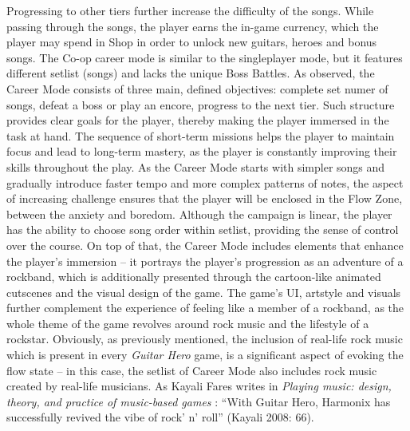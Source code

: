 Progressing to other tiers further increase the difficulty of the songs. While passing through the songs, the player earns the in-game currency, which the player may spend in Shop in order to unlock new guitars, heroes and bonus songs. The Co-op career mode is similar to the singleplayer mode, but it features different setlist (songs) and lacks the unique Boss Battles. As observed, the Career Mode consists of three main, defined objectives: complete set numer of songs, defeat a boss or play an encore, progress to the next tier. Such structure provides clear goals for the player, thereby making the player immersed in the task at hand. The sequence of short-term missions helps the player to maintain focus and lead to long-term mastery, as the player is constantly improving their skills throughout the play. As the Career Mode starts with simpler songs and gradually introduce faster tempo and more complex patterns of notes, the aspect of increasing challenge ensures that the player will be enclosed in the Flow Zone, between the anxiety and boredom. Although the campaign is linear, the player has the ability to choose song order within setlist, providing the sense of control over the course. On top of that, the Career Mode includes elements that enhance the player’s immersion -- it portrays the player’s progression as an adventure of a rockband, which is additionally presented through the cartoon-like animated cutscenes and the visual design of the game. The game’s UI, artstyle and visuals further complement the experience of feeling like a member of a rockband, as the whole theme of the game revolves around rock music and the lifestyle of a rockstar. Obviously, as previously mentioned, the inclusion of real-life rock music which is present in every \textit{Guitar Hero} game, is a significant aspect of evoking the flow state -- in this case, the setlist of Career Mode also includes rock music created by real-life musicians. As Kayali Fares writes in \textit{Playing music: design, theory, and practice of music-based games} \cite{faresplayingmusic}: ``With Guitar Hero, Harmonix has successfully revived the vibe of rock’ n’ roll'' (Kayali 2008: 66).

